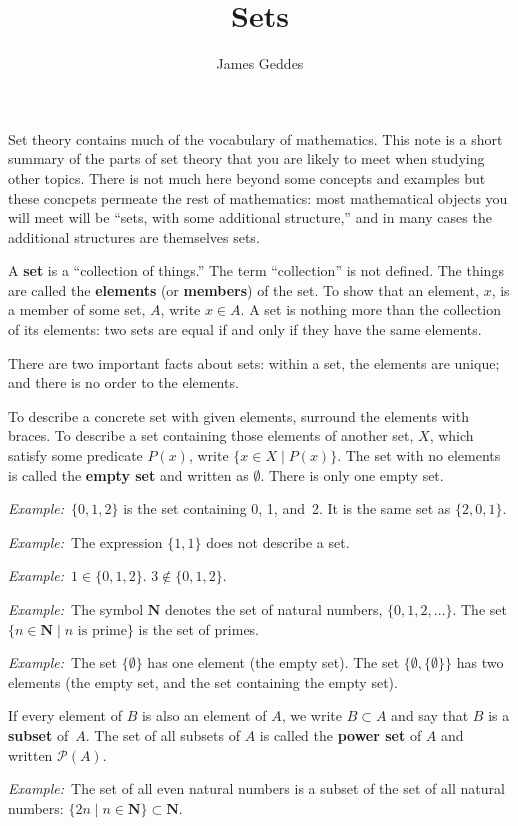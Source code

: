 \documentclass[12pt, a4paper]{article}
\title{\vspace{-6ex}Sets}
\author{James Geddes}
\newcommand{\defn}[1]{\textbf{#1}}
\newcommand{\set}[1]{\mathbold{#1}}
\newcommand{\eg}{\emph{Example:}\relax}
\begin{document}
\maketitle

Set theory contains much of the vocabulary of mathematics. This note
is a short summary of the parts of set theory that you are likely to
meet when studying other topics. There is not much here beyond some
concepts and examples but these concpets permeate the rest of
mathematics: most mathematical objects you will meet will be “sets,
with some additional structure,” and in many cases the additional
structures are themselves sets.

A \defn{set} is a “collection of things.” The term “collection” is not
defined. The things are called the \defn{elements} (or \defn{members})
of the set. To show that an element, $x$, is a member of some set,
$A$, write $x \in A$. A set is nothing more than the collection of its
elements: two sets are equal if and only if they have the same elements.

There are two important facts about sets: within a set, the elements
are unique; and there is no order to the elements.

To describe a concrete set with given elements, surround the elements
with braces. To describe a set containing those elements of another
set, $X$, which satisfy some predicate $P(x)$, write $\{x \in X \mid
P(x)\}$. The set with no elements is called the \defn{empty set} and
written as $\emptyset$. There is only one empty set.

\eg\ $\{0, 1, 2\}$ is the set containing 0, 1, and~2. It is the same
set as $\{2,0,1\}$.

\eg\ The expression $\{1, 1\}$ does not describe a set.

\eg\ $1\in\{0,1,2\}$. $3\notin\{0,1,2\}$.

\eg\ The symbol $\set{N}$ denotes the set of natural numbers,
$\{0,1,2,\dotsc\}$. The set $\{n \in \set{N} \mid \text{$n$ is prime}\}$ is
the set of primes.

\eg\ The set $\{\emptyset\}$ has one element (the empty set). The set $\{\emptyset,
\{\emptyset\}\}$ has two elements (the empty set, and the set containing the
empty set).

If every element of $B$ is also an element of $A$, we write $B \subset A$
and say that $B$ is a \defn{subset} of~$A$. The set of all subsets of
$A$ is called the \defn{power set} of $A$ and written $\mathcal{P}(A)$.

\eg\ The set of all even natural numbers is a subset of the set of all
natural numbers: $\{2n \mid n \in \set{N}\} \subset \set{N}$.
\end{document}

